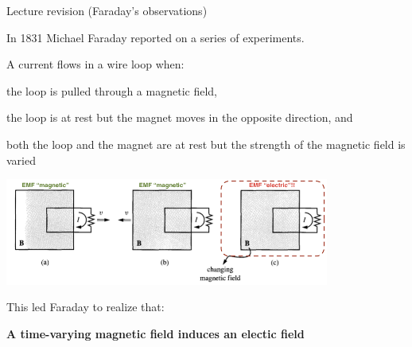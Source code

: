 \begin{frame}{Lecture \summarizedlecture revision (Faraday's observations)}

In 1831 Michael Faraday reported on a series of experiments.\\
\vspace{0.2cm}

A current flows in a wire loop when:
\vspace{0.1cm}
\begin{enumerate}[(a)]
{\small
  \item the loop is pulled through a magnetic field,
  \item the loop is at rest but the magnet moves in the opposite direction, and
  \item both the loop and the magnet are at rest but the strength of the magnetic field is varied
}
\end{enumerate}

\begin{center}
  \includegraphics[width=0.80\textwidth]{./images/schematics/faraday_law_schematic_with_notes.png}
\end{center}
This led Faraday to realize that:
\begin{center}
{\bf A time-varying magnetic field induces an electic field}
\end{center}

\end{frame}

%
%
%

